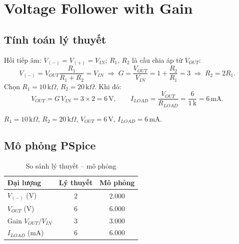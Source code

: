 \section{Voltage Follower with Gain}\label{sec:gain}

\subsection{Tính toán lý thuyết}
Hồi tiếp âm: $V_{(-)} = V_{(+)} = V_{IN}$; $R_1$, $R_2$ là cầu chia áp từ $V_{OUT}$:
\[
V_{(-)} = V_{OUT}\frac{R_1}{R_1+R_2} = V_{IN}
\;\Rightarrow\; G = \frac{V_{OUT}}{V_{IN}} = 1 + \frac{R_2}{R_1} = 3
\;\Rightarrow\; R_2 = 2R_1.
\]
Chọn $R_1 = 10\,\text{k}\Omega$, $R_2 = 20\,\text{k}\Omega$. Khi đó:
\[
V_{OUT} = G\,V_{IN} = 3 \times 2 = 6\,\text{V},\qquad
I_{LOAD} = \frac{V_{OUT}}{R_{LOAD}} = \frac{6}{1\,\text{k}} = 6\,\text{mA}.
\]

\begin{dapsobox}
$R_1 = 10\,\text{k}\Omega$, $R_2 = 20\,\text{k}\Omega$, \quad $V_{OUT} = 6\,\text{V}$, \quad $I_{LOAD} = 6\,\text{mA}$.
\end{dapsobox}

\subsection{Mô phỏng PSpice}
\simresult
{}

\begin{table}[H]
\centering
\begin{tabular}{l c c}
\toprule
\textbf{Đại lượng} & \textbf{Lý thuyết} & \textbf{Mô phỏng}\\
\midrule
$V_{(-)}$ (V)         & 2 & 2.000\\
$V_{OUT}$ (V)         & 6 & 6.000\\
Gain $V_{OUT}/V_{IN}$ & 3 & 3.000\\
$I_{LOAD}$ (mA)       & 6 & 6.000\\
\bottomrule
\end{tabular}
\caption{So sánh lý thuyết -- mô phỏng}
\end{table}

